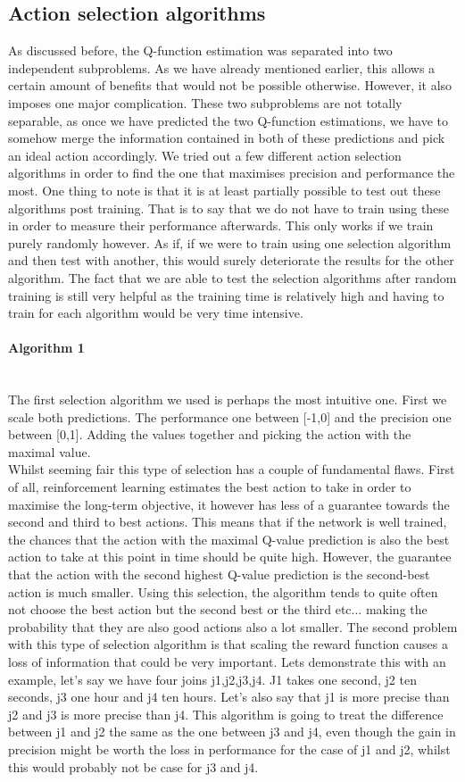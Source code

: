 \subsection{Action selection algorithms}
As discussed before, the Q-function estimation was separated into two independent subproblems. As we have already mentioned earlier, this allows a certain amount of benefits that would not be possible otherwise. However, it also imposes one major complication. These two subproblems are not totally separable, as once we have predicted the two Q-function estimations, we have to somehow merge the information contained in both of these predictions and pick an ideal action accordingly. We tried out a few different action selection algorithms in order to find the one that maximises precision and performance the most. One thing to note is that it is at least partially possible to test out these algorithms post training. That is to say that we do not have to train using these in order to measure their performance afterwards. This only works if we train purely randomly however. As if, if we were to train using one selection algorithm and then test with another, this would surely deteriorate the results for the other algorithm. The fact that we are able to test the selection algorithms after random training is still very helpful as the training time is relatively high and having to train for each algorithm would be very time intensive.
\paragraph{Algorithm 1}\mbox{}\\
The first selection algorithm we used is perhaps the most intuitive one. First we scale both predictions. The performance one between [-1,0] and the precision one between [0,1]. Adding the values together and picking the action with the maximal value.\\
Whilst seeming fair this type of selection has a couple of fundamental flaws. First of all, reinforcement learning estimates the best action to take in order to maximise the long-term objective, it however has less of a guarantee towards the second and third to best actions. This means that if the network is well trained, the chances that the action with the maximal Q-value prediction is also the best action to take at this point in time should be quite high. However, the guarantee that the action with the second highest Q-value prediction is the second-best action is much smaller. Using this selection, the algorithm tends to quite often not choose the best action but the second best or the third etc... making the probability that they are also good actions also a lot smaller. The second problem with this type of selection algorithm is that scaling the reward function causes a loss of information that could be very important. Lets demonstrate this with an example, let's say we have four joins j1,j2,j3,j4. J1 takes one second, j2 ten seconds, j3 one hour and j4 ten hours. Let's also say that j1 is more precise than j2 and j3 is more precise than j4. This algorithm is going to treat the difference between j1 and j2 the same as the one between j3 and j4, even though the gain in precision might be worth the loss in performance for the case of j1 and j2, whilst this would probably not be case for j3 and j4.
